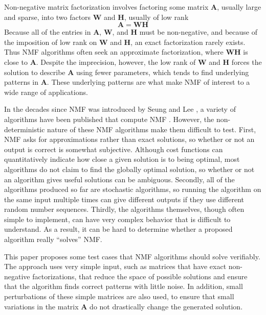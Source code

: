 \documentclass[conference]{IEEEtran}
\begin{document}
Non-negative matrix factorization involves factoring some matrix $ \mathbf{A} $, usually large and sparse, into two factors $ \mathbf{W} $ and $ \mathbf{H} $, usually of low rank
\begin{equation}
\mathbf{A} = \mathbf{WH}
\end{equation}
Because all of the entries in $ \mathbf{A} $, $ \mathbf{W} $, and $ \mathbf{H} $ must be non-negative, and because of the imposition of low rank on $ \mathbf{W} $ and $ \mathbf{H} $, an exact factorization rarely exists.  Thus NMF algorithms often seek an approximate factorization, where $ \mathbf{WH} $ is close to $ \mathbf{A} $.  Despite the imprecision, however, the low rank of $ \mathbf{W} $ and $ \mathbf{H} $ forces the solution to describe $ \mathbf{A} $ using fewer parameters, which tends to find underlying patterns in $ \mathbf{A} $.   These underlying patterns are what make NMF of interest to a wide range of applications.

In the decades since NMF was introduced by Seung and Lee \cite{NIPS2000_1861}, a variety of algorithms have been published that compute NMF \cite{ALS}.  However, the non-deterministic nature of these NMF algorithms make them difficult to test.  First, NMF asks for approximations rather than exact solutions, so whether or not an output is correct is somewhat subjective.  Although cost functions can quantitatively indicate how close a given solution is to being optimal, most algorithms do not claim to find the globally optimal solution, so whether or not an algorithm gives useful solutions can be ambiguous.  Secondly, all of the algorithms produced so far are stochastic algorithms, so running the algorithm on the same input multiple times can give different outputs if they use different random number sequences.  Thirdly, the algorithms themselves, though often simple to implement, can have very complex behavior that is difficult to understand.  As a result, it can be hard to determine whether a proposed algorithm really ``solves'' NMF.

This paper proposes some test cases that NMF algorithms should solve verifiably.  The approach uses very simple input, such as matrices that have exact non-negative factorizations, that reduce the space of possible solutions and ensure that the algorithm finds correct patterns with little noise.  In addition, small perturbations of these simple matrices are also used, to ensure that small variations in the matrix $ \mathbf{A} $ do not drastically change the generated solution.
\end{document}
